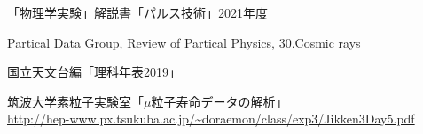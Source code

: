 \documentclass[a4paper,11pt]{jsarticle}
\begin{document}
\begin{thebibliography}{99}
    「物理学実験」解説書「パルス技術」2021年度

    Partical Data Group, Review of Partical Physics, 30.Cosmic rays 
  
    国立天文台編「理科年表2019」

    筑波大学素粒子実験室「$\mu$粒子寿命データの解析」\\
    \url{http://hep-www.px.tsukuba.ac.jp/~doraemon/class/exp3/Jikken3Day5.pdf}

\end{thebibliography}
\end{document}
